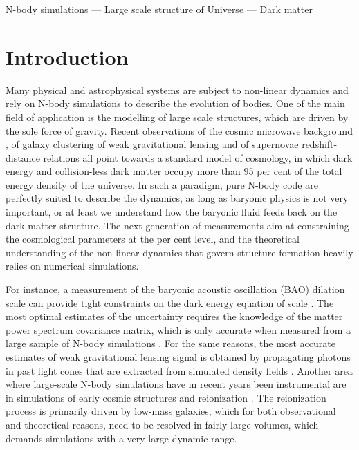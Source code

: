 \documentclass[useAMS,usenatbib]{mn2e}
\begin{document}
\begin{keywords}
N-body simulations --- Large scale structure of Universe --- Dark matter
\end{keywords}


\section{Introduction}

Many physical and astrophysical systems are subject to non-linear dynamics
and rely on N-body simulations to describe the evolution of bodies. 
One of the main field of application is the modelling of large scale structures, 
which are driven by the sole force of gravity. Recent observations of the 
cosmic microwave background \citep{2009ApJS..180..330K,2011ApJS..192...18K}, of galaxy clustering 
\citep{2000AJ....120.1579Y, 2003astro.ph..6581C, 2009arXiv0902.4680S, 
2010MNRAS.401.1429D} of weak gravitational lensing \citep{2012AAS...21913001H, 2009ApJ...703.2232S}
and of supernovae redshift-distance relations all point towards a standard 
model of cosmology, in which dark energy and collision-less dark matter occupy 
more than 95 per cent of the total energy density of the universe. In such a 
paradigm, pure N-body code are perfectly suited to describe the dynamics, as 
long as baryonic physics is not very important, or at least we understand how 
the baryonic fluid feeds back on the dark matter structure. The next generation 
of measurements aim at constraining the cosmological parameters at the per cent 
level, and the theoretical understanding of the non-linear dynamics that govern 
structure formation heavily relies on numerical simulations. 

For instance, a measurement of the baryonic acoustic oscillation (BAO) dilation 
scale can provide tight constraints on the dark energy equation of scale 
\citep{Eisenstein:2005su,2006PhRvD..74l3507T, 2007MNRAS.381.1053P,2009arXiv0902.4680S}. 
The most optimal estimates of the uncertainty requires the 
knowledge of the matter power spectrum covariance matrix, which is only accurate 
when measured from a large sample of N-body simulations \citep{2005MNRAS.360L..82R, 
2009ApJ...700..479T, 2011ApJ...726....7T}. For the same reasons, the most accurate 
estimates of weak gravitational lensing signal is obtained by propagating photons 
in past light cones that are extracted from simulated density fields 
\citep{2003ApJ...592..699V, 2009ApJ...701..945S, 2009A&A...499...31H}.
Another area where large-scale N-body simulations have in recent years been 
instrumental are in simulations of early cosmic structures and reionization 
\citep[e.g.][]{2006MNRAS.369.1625I,2007ApJ...654...12Z,2007ApJ...671....1T,
2011arXiv1107.4772I}. The reionization process is primarily driven by low-mass 
galaxies, which for both observational and theoretical reasons, need to be resolved 
in fairly large volumes, which demands simulations with a very large dynamic range.   
\end{document}
